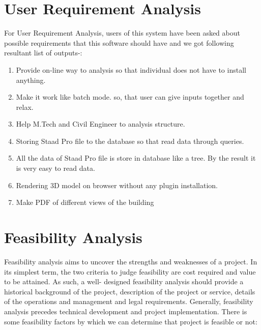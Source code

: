 \section{User Requirement Analysis}
For User Requirement Analysis, users of this system have been asked about possible requirements
that this software should have and we got following resultant list of outputs-:

\begin{enumerate}
\item Provide on-line way to analysis so that individual does not have to install anything.
\item Make it work like batch mode. so, that user can give inputs together and relax.
\item Help M.Tech and Civil Engineer to analysis structure.
\item Storing Staad Pro file to the database so that read data through queries.
\item All the data of Staad Pro file is store in database like a tree. By the result it is very easy to read data.
\item Rendering 3D model on browser without any plugin installation. 
\item Make PDF of different views of the building 
\end{enumerate}

\section{Feasibility Analysis}
Feasibility analysis aims to uncover the strengths and weaknesses of a project. In its simplest term,
the two criteria to judge feasibility are cost required and value to be attained. As such, a well-
designed feasibility analysis should provide a historical background of the project, description of the
project or service, details of the operations and management and legal requirements. Generally,
feasibility analysis precedes technical development and project implementation. There is some
feasibility factors by which we can determine that project is feasible or not:

